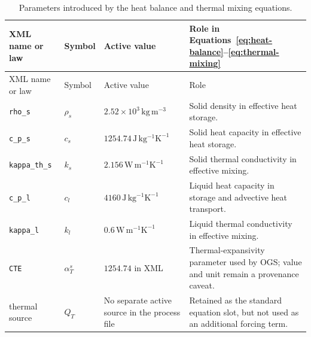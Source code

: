 \begingroup
\small
\setlength{\tabcolsep}{3pt}
\begin{longtable}{@{}L{0.20\textwidth} L{0.16\textwidth} L{0.23\textwidth} L{0.31\textwidth}@{}}
\caption{Parameters introduced by the heat balance and thermal mixing equations.}
\label{tab:thermal-parameters}\\
\toprule
XML name or law & Symbol & Active value & Role in Equations~\eqref{eq:heat-balance}--\eqref{eq:thermal-mixing}\\
\midrule
\endfirsthead
\toprule
XML name or law & Symbol & Active value & Role\\
\midrule
\endhead
\bottomrule
\endlastfoot
\texttt{rho\_s} & \(\rho_s\) &
\(2.52\times10^3\,\mathrm{kg\,m^{-3}}\) &
Solid density in effective heat storage.\\
\texttt{c\_p\_s} & \(c_s\) &
\(1254.74\,\mathrm{J\,kg^{-1}K^{-1}}\) &
Solid heat capacity in effective heat storage.\\
\texttt{kappa\_th\_s} & \(k_s\) &
\(2.156\,\mathrm{W\,m^{-1}K^{-1}}\) &
Solid thermal conductivity in effective mixing.\\
\texttt{c\_p\_l} & \(c_l\) &
\(4160\,\mathrm{J\,kg^{-1}K^{-1}}\) &
Liquid heat capacity in storage and advective heat transport.\\
\texttt{kappa\_l} & \(k_l\) &
\(0.6\,\mathrm{W\,m^{-1}K^{-1}}\) &
Liquid thermal conductivity in effective mixing.\\
\texttt{CTE} & \(\alpha_T^s\) &
\(1254.74\) in XML &
Thermal-expansivity parameter used by OGS; value and unit remain a provenance caveat.\\
thermal source & \(Q_T\) &
No separate active source in the process file &
Retained as the standard equation slot, but not used as an additional forcing term.\\
\end{longtable}
\endgroup
